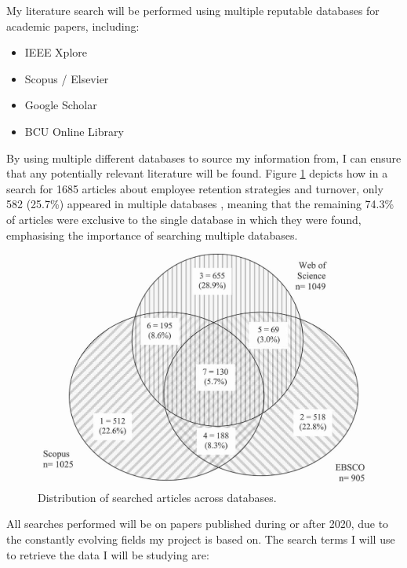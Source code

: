\documentclass[12pt]{report}
\begin{document}
    \noindent 
    My literature search will be performed using multiple reputable databases for academic papers, including:
    \begin{itemize}
        \item IEEE Xplore
        \item Scopus / Elsevier
        \item Google Scholar
        \item BCU Online Library
    \end{itemize}
    
    \noindent By using multiple different databases to source my information from, I can ensure that
    any potentially relevant literature will be found. Figure \ref{fig:litSearch} depicts 
    how in a search for 1685 articles about employee retention strategies and turnover, only 582 (25.7\%) appeared in multiple databases
    \autocite{litSearch}, meaning that the remaining 74.3\% of articles were exclusive to the single 
    database in which they were found, emphasising the importance of searching multiple databases.  

    \begin{figure}[H]
        \centering
        \includegraphics[width=.6\linewidth]{litSearchDBs.jpg}
        \caption{Distribution of searched articles across databases. \autocite{litSearch}}
        \label{fig:litSearch}
    \end{figure}
   
    \noindent 
    All searches performed will be on papers published during or after 2020, due to the 
    constantly evolving fields my project is based on. The search terms I will use to retrieve
    the data I will be studying are:
\end{document}
